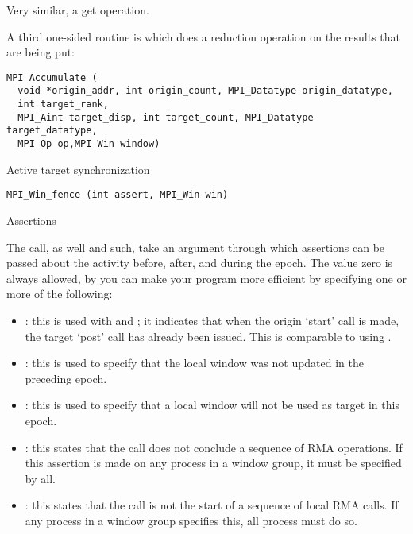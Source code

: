 Very similar, a get operation.

A third one-sided routine
is  which does a reduction operation on the results
that are being put:
\begin{verbatim}
MPI_Accumulate (
  void *origin_addr, int origin_count, MPI_Datatype origin_datatype, 
  int target_rank,
  MPI_Aint target_disp, int target_count, MPI_Datatype target_datatype,
  MPI_Op op,MPI_Win window)
\end{verbatim}

 {Active target synchronization}

\begin{verbatim}
MPI_Win_fence (int assert, MPI_Win win)
\end{verbatim}

 {Assertions}
\label{sec:mpi-assert}

The  call, as well  and such, take an argument
through which assertions can be passed about the activity before, after, and during the epoch.
The value zero is always allowed, by you can make your program more efficient by specifying
one or more of the following:
\begin{itemize}
\item {}: this is used with
   and ; it
  indicates that when the origin `start' call is made, the target
  `post' call has already been issued. This is comparable to using
  .
\item {}: this is used to specify that
  the local window was not updated in the preceding epoch.
\item {}: this is used to specify that a local
  window will not be used as target in this epoch.
\item {}: this states that the
   call does not conclude a sequence of
  RMA operations. If this assertion is made on any process in a window group,
  it must be specified by all.
\item {}: this states that the
   call is not the start of a sequence of
  local RMA calls. If any process in a window group specifies this,
  all process must do so.
\end{itemize}

